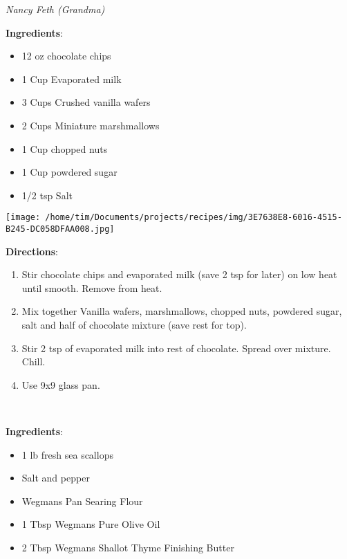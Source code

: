 \documentclass[11pt, twoside, openany]{book}
\begin{document}
 \label{no-bake-brownies}\hfill\textit{Nancy Feth (Grandma)}\\
\begin{minipage}[t]{0.8\linewidth}
\textbf{Ingredients}:\vspace{-3mm}
\begin{multicols}{2}
\begin{itemize}\setlength\itemsep{-1mm}
\item 12 oz chocolate chips
\item 1 Cup Evaporated milk
\item 3 Cups Crushed vanilla wafers
\item 2 Cups Miniature marshmallows
\item 1 Cup chopped nuts
\item 1 Cup powdered sugar
\item 1/2 tsp Salt
\end{itemize}
\end{multicols}
\end{minipage}
\begin{minipage}[t]{0.2\linewidth}
\centering \strut\vspace*{-\baselineskip}\newline
\texttt{[image: /home/tim/Documents/projects/recipes/img/3E7638E8-6016-4515-B245-DC058DFAA008.jpg]}\\
\end{minipage}\vspace{3mm}
\textbf{Directions}:
\vspace{-3mm}\begin{enumerate}\setlength\itemsep{-1mm}
\item Stir chocolate chips and evaporated milk (save 2 tsp for later) on low heat until smooth. Remove from heat.
\item Mix together Vanilla wafers, marshmallows, chopped nuts, powdered sugar, salt and half of chocolate mixture (save rest for top).
\item Stir 2 tsp of evaporated milk into rest of chocolate. Spread over mixture. Chill.
\item Use 9x9 glass pan.
\end{enumerate}
 \label{pan-seared-scallops}\hfill\textit{}\\
\begin{minipage}[t]{0.8\linewidth}
\textbf{Ingredients}:\vspace{-3mm}
\begin{multicols}{2}
\begin{itemize}\setlength\itemsep{-1mm}
\item 1 lb fresh sea scallops
\item Salt and pepper
\item Wegmans Pan Searing Flour
\item 1 Tbsp Wegmans Pure Olive Oil
\item 2 Tbsp Wegmans Shallot Thyme Finishing Butter
\end{itemize}
\end{multicols}
\end{minipage}
\end{document}
